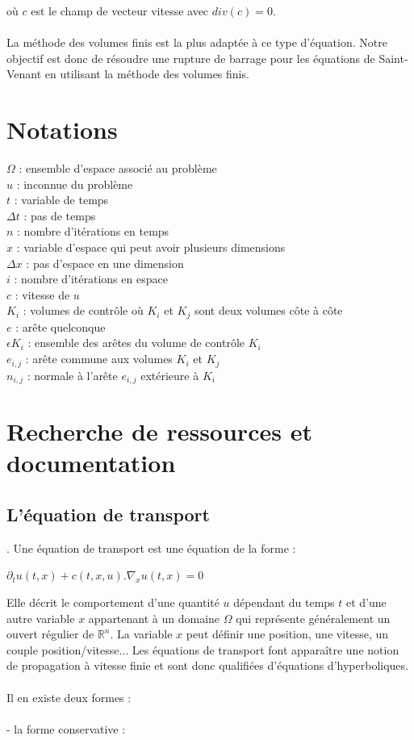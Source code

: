 \documentclass[12pt]{article}
\begin{document}
\noindent où $c$ est le champ de vecteur vitesse avec $div(c)=0$. 
\\
\\La méthode des volumes finis est la plus adaptée à ce type d'équation. Notre objectif est donc de résoudre une rupture de barrage pour les équations de Saint-Venant \cite{ref1} en utilisant la méthode des volumes finis.


\section{Notations}

\noindent $\Omega$ : ensemble d'espace associé au problème
\\$u$ : inconnue du problème
\\$t$ : variable de temps
\\$\Delta t$ : pas de temps
\\$n$ : nombre d'itérations en temps
\\$x$ : variable d'espace qui peut avoir plusieurs dimensions
\\$\Delta x$ : pas d'espace en une dimension
\\$i$ : nombre d'itérations en espace
\\$c$ : vitesse de $u$
\\$K_i$ : volumes de contrôle où $K_i$ et $K_j$ sont deux volumes côte à côte
\\$e$ : arête quelconque
\\$\epsilon K_i$ : ensemble des arêtes du volume de contrôle $K_i$
\\$e_{i,j}$ : arête commune aux volumes $K_i$ et $K_j$
\\$n_{i,j}$ : normale à l'arête $e_{i,j}$ extérieure à $K_i$

	
\section{Recherche de ressources et documentation}
\subsection{L'équation de transport}
. Une équation de transport est une équation de la forme :

\begin{center}
    $\partial_tu(t,x)+c(t,x,u).\nabla_xu(t,x)=0 $
\end{center}

\noindent Elle décrit le comportement d'une quantité $u$ dépendant du temps $t$ et d'une autre variable $x$ appartenant à un domaine $\Omega$ qui représente généralement un ouvert régulier de $\mathbb{R}^n$. La variable $x$ peut définir une position, une vitesse, un couple position/vitesse... 
\newpage \noindent Les équations de transport font apparaître une notion de propagation à vitesse finie et sont donc qualifiées d'équations d'hyperboliques.
\\
\\Il en existe deux formes : 
\\
\\- la forme conservative :
\end{document}
